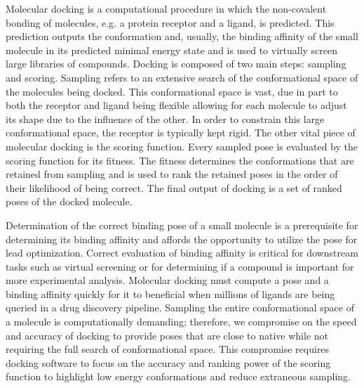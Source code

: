 \documentclass[linenumbers,doublespacing]{bmcart}
\begin{document}
Molecular docking is a computational procedure in which the non-covalent bonding of molecules, e.g. a protein receptor and a ligand, is predicted. This prediction outputs the conformation and, usually, the binding affinity of the small molecule in its predicted minimal energy state and is used to virtually screen large libraries of compounds\cite{kitchen2004docking,leach2006prediction,lyu2019ultra}. Docking is composed of two main steps: sampling and scoring. Sampling refers to an extensive search of the conformational space of the molecules being docked. This conformational space is vast, due in part to both the receptor and ligand being flexible allowing for each molecule to adjust its shape due to the influence of the other. In order to constrain this large conformational space, the receptor is typically kept rigid. The other vital piece of molecular docking is the scoring function. Every sampled pose is evaluated by the scoring function for its fitness. The fitness determines the conformations that are retained from sampling and is used to rank the retained poses in the order of their likelihood of being correct. The final output of docking is a set of ranked poses of the docked molecule. 

Determination of the correct binding pose of a small molecule is a prerequisite for determining its binding affinity and affords the opportunity to utilize the pose for lead optimization. Correct evaluation of binding affinity is critical for downstream tasks such as virtual screening or for determining if a compound is important for more experimental analysis. Molecular docking must compute a pose and a binding affinity quickly for it to beneficial when millions of ligands are being queried in a drug discovery pipeline\cite{kitchen2004docking}. Sampling the entire conformational space of a molecule is computationally demanding; therefore, we compromise on the speed and accuracy of docking to provide poses that are close to native while not requiring the full search of conformational space. This compromise requires docking software to focus on the accuracy and ranking power of the scoring function to highlight low energy conformations and reduce extraneous sampling.
\end{document}
